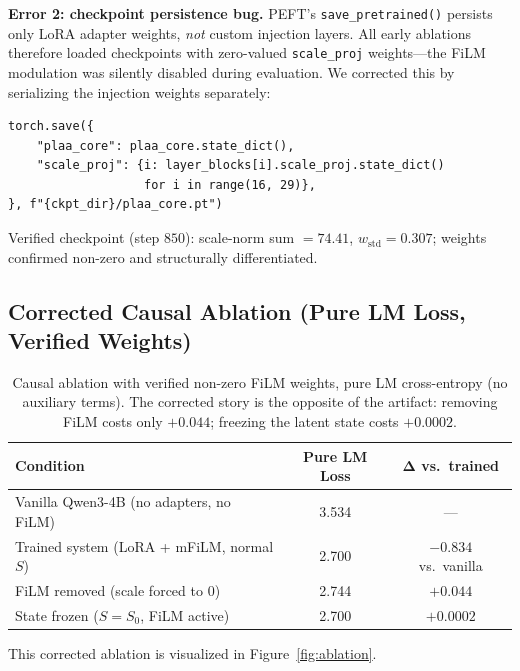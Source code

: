 \documentclass[11pt,a4paper]{article}
\newcommand{\wstd}{w_{\mathrm{std}}}
\begin{document}
\textbf{Error 2: checkpoint persistence bug.} PEFT's \texttt{save\_pretrained()}
persists only LoRA adapter weights, \emph{not} custom injection layers. All early
ablations therefore loaded checkpoints with zero-valued \texttt{scale\_proj}
weights---the FiLM modulation was silently disabled during evaluation. We corrected
this by serializing the injection weights separately:

\begin{lstlisting}
torch.save({
    "plaa_core": plaa_core.state_dict(),
    "scale_proj": {i: layer_blocks[i].scale_proj.state_dict()
                   for i in range(16, 29)},
}, f"{ckpt_dir}/plaa_core.pt")
\end{lstlisting}

Verified checkpoint (step $850$): scale-norm sum $= 74.41$, $\wstd = 0.307$; weights
confirmed non-zero and structurally differentiated.

\subsection{Corrected Causal Ablation (Pure LM Loss, Verified Weights)}

\begin{table}[h]
\centering
\begin{tabular}{lcc}
\toprule
\textbf{Condition} & \textbf{Pure LM Loss} & $\boldsymbol{\Delta}$ \textbf{vs.\ trained} \\
\midrule
Vanilla Qwen3-4B (no adapters, no FiLM)      & 3.534 & --- \\
Trained system (LoRA + mFiLM, normal $S$)    & 2.700 & $-0.834$ vs.\ vanilla \\
FiLM removed (scale forced to 0)             & 2.744 & $+0.044$ \\
State frozen ($S = S_0$, FiLM active)        & 2.700 & $+0.0002$ \\
\bottomrule
\end{tabular}
\caption{Causal ablation with verified non-zero FiLM weights, pure LM cross-entropy
(no auxiliary terms). The corrected story is the opposite of the artifact: removing
FiLM costs only $+0.044$; freezing the latent state costs $+0.0002$.}
\label{tab:causal}
\end{table}

This corrected ablation is visualized in Figure~\ref{fig:ablation}.
\end{document}
